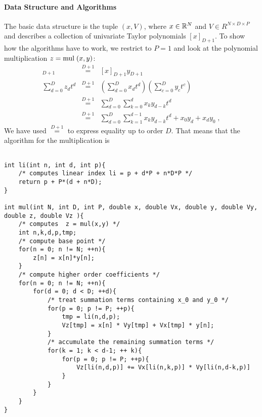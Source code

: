 \documentclass[a4paper,12pt,twoside]{article}
\begin{document}
\paragraph{Data Structure and Algorithms}
The basic data structure is the tuple $(x, V)$, where $x \in {\mathbb R}^N$ and $V \in R^{N \times D \times P}$ and describes a collection of univariate Taylor polynomials $[x]_{D+1}$.
To show how the algorithms have to work, we restrict to $P=1$ and look at the polynomial multiplication $z = \mathrm{mul}\;(x,y)$:
\begin{eqnarray}
[z]_{D+1} &\stackrel{D+1}{=}& [x]_{D+1} y_{D+1} \\
\sum_{d=0}^D z_d t^d &\stackrel{D+1}{=}& \left( \sum_{d=0}^D x_d t^d \right) \left( \sum_{c=0}^D y_c t^c \right)   \\
&\stackrel{D+1}{=}& \sum_{d=0}^D \sum_{k=0}^d x_k y_{d-k} t^d \\
&\stackrel{D+1}{=}& \sum_{d=0}^D \sum_{k=1}^{d-1} x_k y_{d-k} t^d  + x_0 y_d + x_d y_0\;,
\end{eqnarray}
We have used $\stackrel{D+1}{=}$ to express equality up to order $D$. That means that the algorithm for the multiplication is
{\scriptsize
\begin{verbatim}

int li(int n, int d, int p){
    /* computes linear index li = p + d*P + n*D*P */
    return p + P*(d + n*D);
}

int mul(int N, int D, int P, double x, double Vx, double y, double Vy, double z, double Vz ){
    /* computes  z = mul(x,y) */
    int n,k,d,p,tmp;
    /* compute base point */
    for(n = 0; n != N; ++n){
        z[n] = x[n]*y[n];
    }
    /* compute higher order coefficients */
    for(n = 0; n != N; ++n){
        for(d = 0; d < D; ++d){
            /* treat summation terms containing x_0 and y_0 */
            for(p = 0; p != P; ++p){
                tmp = li(n,d,p);
                Vz[tmp] = x[n] * Vy[tmp] + Vx[tmp] * y[n];
            }
            /* accumulate the remaining summation terms */ 
            for(k = 1; k < d-1; ++ k){
                for(p = 0; p != P; ++p){
                    Vz[li(n,d,p)] += Vx[li(n,k,p)] * Vy[li(n,d-k,p)]
                }
            }
        }
    }
}
\end{verbatim}
}

 


% 





\end{document}
